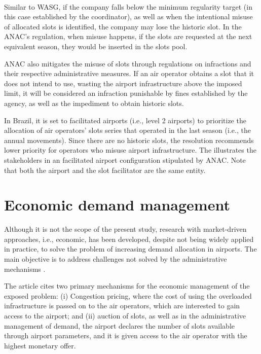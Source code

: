 \\
 Similar to \acrshort{WASG}, if the company falls below the minimum regularity target (in this case established by the coordinator), as well as when the intentional misuse of allocated slots is identified, the company may lose the historic slot. In the \acrshort{ANAC}’s regulation, when misuse happens, if the slots are requested at the next equivalent season, they would be inserted in the slots pool.

 \acrshort{ANAC} also mitigates the misuse of slots through regulations on infractions and their respective administrative measures. If an air operator obtains a slot that it does not intend to use, wasting the airport infrastructure above the imposed limit, it will be considered an infraction punishable by fines established by the agency, as well as the impediment to obtain historic slots.

 In Brazil, it is set to facilitated airports (i.e., level 2 airports) to prioritize the allocation of air operators’ slots series that operated in the last season (i.e., the annual movements). Since there are no historic slots, the resolution recommends lower priority for operators who misuse airport infrastructure. The  illustrates the stakeholders in an facilitated airport configuration stipulated by \acrshort{ANAC}. Note that both the airport and the slot facilitator are the same entity.


 \section{Economic demand management}
Although it is not the scope of the present study, research with market-driven approaches, i.e., economic, has been developed, despite not being widely applied in practice, to solve the problem of increasing demand allocation in airports. The main objective is to address challenges not solved by the administrative mechanisms \cite{ball2006auctions}.

The article  cites two primary mechanisms for the economic management of the exposed problem: (i) Congestion pricing, where the cost of using the overloaded infrastructure is passed on to the air operators, which are interested to gain access to the airport; and (ii) auction of slots, as well as in the administrative management of demand, the airport declares the number of slots available through airport parameters, and it is given access to the air operator with the highest monetary offer.

